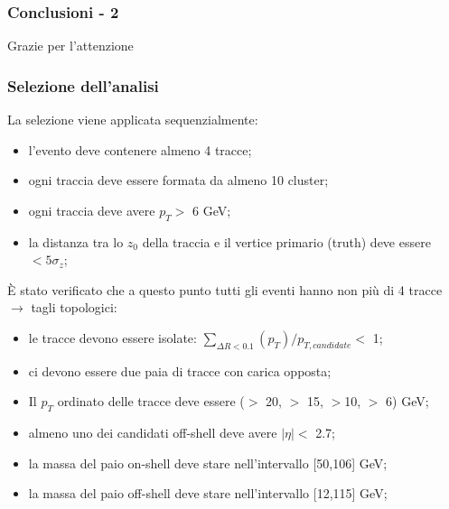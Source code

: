 \documentclass{beamer}
\begin{document}
\begin{frame}[label=Conclusions]
\frametitle{Conclusioni - 2}

\bigskip
\bigskip
\bigskip
{} {
\centering
\color{dred} Grazie per l'attenzione
}

\end{frame}


\begin{frame}[t]
\frametitle{Selezione dell'analisi}

La selezione viene applicata sequenzialmente:
\begin{itemize}
\item<1-> l'evento deve contenere almeno 4 tracce;
\item<2-> ogni traccia deve essere formata da almeno 10 cluster;
\item<3-> ogni traccia deve avere $p_{T} >$ 6 GeV;
\item<4-> la distanza tra lo $z_{0}$ della traccia e il vertice primario (truth) deve essere $< 5\sigma_{z}$;
\end{itemize}
\medskip
\pause
\pause
\pause
\pause
\`E stato verificato che a questo punto tutti gli eventi hanno non pi\`u di 4 tracce $\rightarrow$ tagli topologici:
\begin{itemize}
\item<6-> le tracce devono essere isolate: $\sum_{\Delta R < 0.1} (p_{T}) / p_{T, candidate} <$ 1;
\item<7-> ci devono essere due paia di tracce con carica opposta;
\item<8-> Il $p_{T}$ ordinato delle tracce deve essere ($>$ 20, $>$ 15, $>$10, $>$ 6) GeV;
\item<9-> almeno uno dei candidati off-shell
deve avere $|\eta| <$ 2.7;
\item<10-> la massa del paio on-shell deve stare nell'intervallo [50,106] GeV;
\item<11-> la massa del paio off-shell deve stare nell'intervallo [12,115] GeV;
\end{itemize}

\end{frame}
\end{document}
